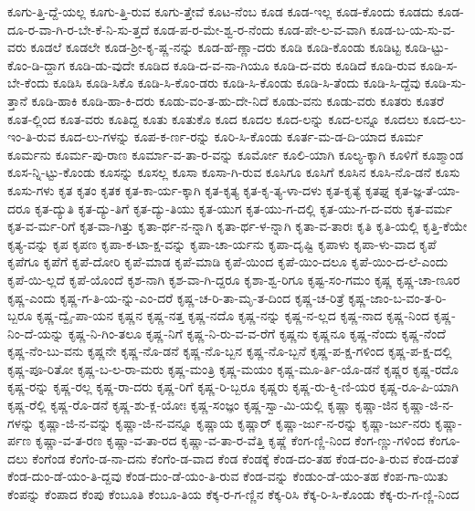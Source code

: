 {ಕೂಗು-ತ್ತಿ-ದ್ದೆ-ಯಲ್ಲ
ಕೂಗು-ತ್ತಿ-ರುವ
ಕೂಗು-ತ್ತೇವೆ
ಕೂಟ-ನೆಂಬ
ಕೂಡ
ಕೂಡ-ಇಲ್ಲ
ಕೂಡ-ಕೊಂದು
ಕೂಡದು
ಕೂಡ-ದೂ-ರ-ವಾ-ಗಿ-ರ-ಬೇ-ಕೆ-ನಿ-ಸು-ತ್ತದೆ
ಕೂಡ-ಪ-ರ-ಮೇ-ಶ್ವ-ರ-ನೆಂದು
ಕೂಡ-ಪೇ-ಲ-ವ-ವಾಗಿ
ಕೂಡ-ಬ-ಯ-ಸು-ವ-ವರು
ಕೂಡಲೆ
ಕೂಡಲೇ
ಕೂಡ-ಶ್ರೀ-ಕೃ-ಷ್ಣ-ನನ್ನು
ಕೂಡ-ಹೆ-ಣ್ಣಾ-ದರು
ಕೂಡಿ
ಕೂಡಿ-ಕೊಂಡು
ಕೂಡಿಟ್ಟ
ಕೂಡಿ-ಟ್ಟು-ಕೊಂ-ಡಿ-ದ್ದಾಗ
ಕೂಡಿ-ಡು-ವುದೇ
ಕೂಡಿದ
ಕೂಡಿ-ದ-ವ-ನಾ-ಗಿಯೂ
ಕೂಡಿ-ದ-ವರು
ಕೂಡಿದೆ
ಕೂಡಿ-ರುವ
ಕೂಡಿ-ಸ-ಬೇ-ಕೆಂದು
ಕೂಡಿಸಿ
ಕೂಡಿ-ಸಿಕೊ
ಕೂಡಿ-ಸಿ-ಕೊಂ-ಡರು
ಕೂಡಿ-ಸಿ-ಕೊಂಡು
ಕೂಡಿ-ಸಿ-ತೆಂದು
ಕೂಡಿ-ಸಿ-ದ್ದೆವು
ಕೂಡಿ-ಸು-ತ್ತಾನೆ
ಕೂಡಿ-ಹಾಕಿ
ಕೂಡಿ-ಹಾ-ಕಿ-ದರು
ಕೂಡು-ವಂ-ತ-ಹು-ದೇ-ನಿದೆ
ಕೂಡು-ವನು
ಕೂಡು-ವರು
ಕೂತರು
ಕೂತರೆ
ಕೂತ-ಲ್ಲಿಂದ
ಕೂತ-ವರು
ಕೂತಿದ್ದ
ಕೂತು
ಕೂತುಕೊ
ಕೂದ
ಕೂದಲ
ಕೂದ-ಲನ್ನು
ಕೂದ-ಲನ್ನೂ
ಕೂದಲು
ಕೂದ-ಲು-ಇಂ-ತಿ-ರುವ
ಕೂದ-ಲು-ಗಳನ್ನು
ಕೂಪ-ಕ-ರ್ಣ-ರನ್ನು
ಕೂರಿ-ಸಿ-ಕೊಂಡು
ಕೂರ್ತ-ಮ-ಡ-ದಿ-ಯಾದ
ಕೂರ್ಮ
ಕೂರ್ಮನು
ಕೂರ್ಮ-ಪು-ರಾಣ
ಕೂರ್ಮಾ-ವ-ತಾ-ರ-ವನ್ನು
ಕೂರ್ಮೋ
ಕೂಲಿ-ಯಾಗಿ
ಕೂಲ್ಯ-ಕ್ಕಾಗಿ
ಕೂಳಿಗೆ
ಕೂಶ್ಮಾಂಡ
ಕೂಸ-ನ್ನಿ-ಟ್ಟು-ಕೊಂಡು
ಕೂಸನ್ನು
ಕೂಸಲ್ಲ
ಕೂಸಾ
ಕೂಸಾ-ಗಿ-ರುವ
ಕೂಸಿಗೂ
ಕೂಸಿಗೆ
ಕೂಸಿನ
ಕೂಸಿ-ನೊ-ಡನೆ
ಕೂಸು
ಕೂಸು-ಗಳು
ಕೃತ
ಕೃತಂ
ಕೃತಕ
ಕೃತ-ಕಾ-ರ್ಯ-ಕ್ಕಾಗಿ
ಕೃತ-ಕೃತ್ಯ
ಕೃತ-ಕೃ-ತ್ಯ-ಳಾ-ದಳು
ಕೃತ-ಕೃತ್ಯೆ
ಕೃತಘ್ನ
ಕೃತ-ಜ್ಞ-ತೆ-ಯಾ-ದರೂ
ಕೃತ-ದ್ಯುತಿ
ಕೃತ-ದ್ಯು-ತಿಗೆ
ಕೃತ-ದ್ಯು-ತಿಯು
ಕೃತ-ಯುಗ
ಕೃತ-ಯು-ಗ-ದಲ್ಲಿ
ಕೃತ-ಯು-ಗ-ದ-ವರು
ಕೃತ-ವರ್ಮ
ಕೃತ-ವ-ರ್ಮ-ರಿಗೆ
ಕೃತ-ವಾ-ಗಿತ್ತು
ಕೃತಾ-ರ್ಥ-ನ-ನ್ನಾಗಿ
ಕೃತಾ-ರ್ಥ-ಳ-ನ್ನಾಗಿ
ಕೃತಾ-ವ-ತಾರಃ
ಕೃತಿ
ಕೃತಿ-ಯಲ್ಲಿ
ಕೃತ್ತಿ-ಕೆಯೇ
ಕೃತ್ಯ-ವನ್ನು
ಕೃಪ
ಕೃಪಣ
ಕೃಪಾ-ಕ-ಟಾ-ಕ್ಷ-ವನ್ನು
ಕೃಪಾ-ಚಾ-ರ್ಯನು
ಕೃಪಾ-ದೃಷ್ಟಿ
ಕೃಪಾಳು
ಕೃಪಾ-ಳು-ವಾದ
ಕೃಪೆ
ಕೃಪೆಗೂ
ಕೃಪೆಗೆ
ಕೃಪೆ-ದೋರಿ
ಕೃಪೆ-ಮಾಡ
ಕೃಪೆ-ಮಾಡಿ
ಕೃಪೆ-ಯಿಂದ
ಕೃಪೆ-ಯಿಂ-ದಲೂ
ಕೃಪೆ-ಯಿಂ-ದ-ಲೆ-ಎಂದು
ಕೃಪೆ-ಯಿ-ಲ್ಲದೆ
ಕೃಪೆ-ಯೊಂದೆ
ಕೃಶ-ನಾಗಿ
ಕೃಶ-ವಾ-ಗಿ-ದ್ದರೂ
ಕೃಶಾ-ಶ್ವ-ರಿಗೂ
ಕೃಷ್ಟ-ಸಂ-ಗಮಂ
ಕೃಷ್ಣ
ಕೃಷ್ಣ-ಚಾ-ಣೂರ
ಕೃಷ್ಣ-ಎಂದು
ಕೃಷ್ಣ-ಗ-ತಿ-ಯ-ನ್ನು-ಎಂ-ದರೆ
ಕೃಷ್ಣ-ಚ-ರಿ-ತಾ-ಮೃ-ತ-ದಿಂದ
ಕೃಷ್ಣ-ಚ-ರಿತ್ರೆ
ಕೃಷ್ಣ-ಜಾಂ-ಬ-ವಂ-ತ-ರಿ-ಬ್ಬರೂ
ಕೃಷ್ಣ-ದ್ವೈ-ಪಾ-ಯನ
ಕೃಷ್ಣನ
ಕೃಷ್ಣ-ನತ್ತ
ಕೃಷ್ಣ-ನದೊ
ಕೃಷ್ಣ-ನನ್ನು
ಕೃಷ್ಣ-ನ-ಲ್ಲದ
ಕೃಷ್ಣ-ನಾದ
ಕೃಷ್ಣ-ನಿಂದ
ಕೃಷ್ಣ-ನಿಂ-ದೆ-ಯನ್ನು
ಕೃಷ್ಣ-ನಿ-ಗಿಂ-ತಲೂ
ಕೃಷ್ಣ-ನಿಗೆ
ಕೃಷ್ಣ-ನಿ-ರು-ವ-ವ-ರೆಗೆ
ಕೃಷ್ಣನು
ಕೃಷ್ಣನೂ
ಕೃಷ್ಣ-ನೆಂದು
ಕೃಷ್ಣ-ನೆಂದೆ
ಕೃಷ್ಣ-ನೆಂ-ಬು-ವನು
ಕೃಷ್ಣನೇ
ಕೃಷ್ಣ-ನೊ-ಡನೆ
ಕೃಷ್ಣ-ನೊ-ಬ್ಬನ
ಕೃಷ್ಣ-ನೊ-ಬ್ಬನೆ
ಕೃಷ್ಣ-ಪ-ಕ್ಷ-ಗಳಿಂದ
ಕೃಷ್ಣ-ಪ-ಕ್ಷ-ದಲ್ಲಿ
ಕೃಷ್ಣ-ಪೂ-ರಿತೋ
ಕೃಷ್ಣ-ಬ-ಲ-ರಾ-ಮರು
ಕೃಷ್ಣ-ಮಂತ್ರಿ
ಕೃಷ್ಣ-ಮಯಂ
ಕೃಷ್ಣ-ಮೂ-ರ್ತಿ-ಯೊ-ಡನೆ
ಕೃಷ್ಣರ
ಕೃಷ್ಣ-ರದೊ
ಕೃಷ್ಣ-ರನ್ನು
ಕೃಷ್ಣ-ರಲ್ಲ
ಕೃಷ್ಣ-ರಾ-ದರು
ಕೃಷ್ಣ-ರಿಗೆ
ಕೃಷ್ಣ-ರಿ-ಬ್ಬರೂ
ಕೃಷ್ಣರು
ಕೃಷ್ಣ-ರು-ಕ್ಮಿ-ಣಿ-ಯರ
ಕೃಷ್ಣ-ರೂ-ಪಿ-ಯಾಗಿ
ಕೃಷ್ಣ-ರೆಲ್ಲಿ
ಕೃಷ್ಣ-ರೊ-ಡನೆ
ಕೃಷ್ಣ-ಶು-ಕ್ಲ-ಯೋಃ
ಕೃಷ್ಣ-ಸಂಜ್ಞಂ
ಕೃಷ್ಣ-ಸ್ವಾ-ಮಿ-ಯಲ್ಲಿ
ಕೃಷ್ಣಾ
ಕೃಷ್ಣಾ-ಜಿನ
ಕೃಷ್ಣಾ-ಜಿ-ನ-ಗಳನ್ನು
ಕೃಷ್ಣಾ-ಜಿ-ನ-ವನ್ನು
ಕೃಷ್ಣಾ-ಜಿ-ನ-ವನ್ನೂ
ಕೃಷ್ಣಾಯ
ಕೃಷ್ಣಾರ್
ಕೃಷ್ಣಾ-ರ್ಜು-ನ-ರನ್ನು
ಕೃಷ್ಣಾ-ರ್ಜು-ನರು
ಕೃಷ್ಣಾ-ರ್ಪಣ
ಕೃಷ್ಣಾ-ವ-ತ-ರಣ
ಕೃಷ್ಣಾ-ವ-ತಾ-ರದ
ಕೃಷ್ಣಾ-ವ-ತಾ-ರ-ವೆತ್ತಿ
ಕೃಷ್ಣೆ
ಕೆಂಗ-ಣ್ಣಿ-ನಿಂದ
ಕೆಂಗ-ಣ್ಣು-ಗಳಿಂದ
ಕೆಂಗೂ-ದಲು
ಕೆಂಗೆಂಡ
ಕೆಂಗೆಂ-ಡ-ನಾ-ದನು
ಕೆಂಗೆಂ-ಡ-ವಾದ
ಕೆಂಡ
ಕೆಂಡಕ್ಕೆ
ಕೆಂಡ-ದಂ-ತಹ
ಕೆಂಡ-ದಂ-ತಿ-ರುವ
ಕೆಂಡ-ದಂತೆ
ಕೆಂಡ-ದುಂ-ಡೆ-ಯಂ-ತಿ-ದ್ದವು
ಕೆಂಡ-ದುಂ-ಡೆ-ಯಂ-ತಿ-ರುವ
ಕೆಂಡ-ವನ್ನು
ಕೆಂಡುಂ-ಡೆ-ಯಂ-ತಹ
ಕೆಂಪ-ಗಾ-ಯಿತು
ಕೆಂಪನ್ನು
ಕೆಂಪಾದ
ಕೆಂಪು
ಕೆಂಬೂತಿ
ಕೆಂಬೂ-ತಿಯ
ಕೆಕ್ಕ-ರ-ಗ-ಣ್ಣಿನ
ಕೆಕ್ಕ-ರಿಸಿ
ಕೆಕ್ಕ-ರಿ-ಸಿ-ಕೊಂಡು
ಕೆಕ್ಕ-ರು-ಗ-ಣ್ಣಿ-ನಿಂದ
}
